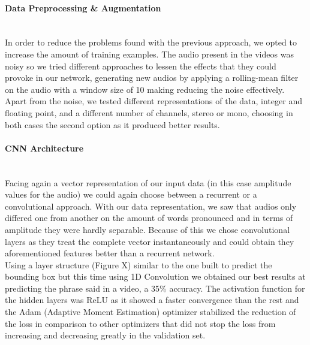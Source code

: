 \documentclass{article}[10pt]
\begin{document}
\begin{multicols}{2}
\paragraph{Data Preprocessing \& Augmentation} ~\\

In order to reduce the problems found with the previous approach, we opted to
increase the amount of training examples. The audio present in the videos was
noisy so we tried different approaches to lessen the effects that they could
provoke in our network, generating new audios by applying a rolling-mean filter
on the audio with a window size of 10 making reducing the noise effectively.\\

Apart from the noise, we tested different representations of the data, integer
and floating point, and a different number of channels, stereo or mono, choosing
in both cases the second option as it produced better results.

\paragraph{CNN Architecture} ~\\

Facing again a vector representation of our input data (in this case
amplitude values for the audio) we could again choose between a recurrent or a
convolutional approach. With our data representation, we saw that audios only
differed one from another on the amount of words pronounced and in terms
of amplitude they were hardly separable. Because of this we chose convolutional
layers as they treat the complete vector instantaneously and could obtain they
aforementioned features better than a recurrent network. \\

Using a layer structure (Figure X) similar to the one built to predict the
bounding box but this time using 1D Convolution we obtained our best results at
predicting the phrase said in a video, a 35\% accuracy. The activation function
for the hidden layers was ReLU as it showed a faster convergence than the rest
and the Adam (Adaptive Moment Estimation) optimizer stabilized the reduction of
the loss in comparison to other optimizers that did not stop the loss from
increasing and decreasing greatly in the validation set.


\end{multicols}
\end{document}

